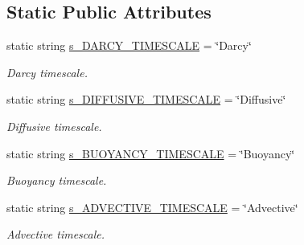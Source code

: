 \subsection*{Static Public Attributes}
\begin{DoxyCompactItemize}
\item 
\mbox{\label{class_mushy_layer_params_a8b58b8b36c7fe399d6b8e6c704459421}} 
static string \hyperlink{class_mushy_layer_params_a8b58b8b36c7fe399d6b8e6c704459421}{s\+\_\+\+D\+A\+R\+C\+Y\+\_\+\+T\+I\+M\+E\+S\+C\+A\+LE} = \char`\"{}Darcy\char`\"{}
\begin{DoxyCompactList}\small\item\em Darcy timescale. \end{DoxyCompactList}\item 
\mbox{\label{class_mushy_layer_params_ac67a4fe28ad2dd726bb0c27f0a8d0be2}} 
static string \hyperlink{class_mushy_layer_params_ac67a4fe28ad2dd726bb0c27f0a8d0be2}{s\+\_\+\+D\+I\+F\+F\+U\+S\+I\+V\+E\+\_\+\+T\+I\+M\+E\+S\+C\+A\+LE} = \char`\"{}Diffusive\char`\"{}
\begin{DoxyCompactList}\small\item\em Diffusive timescale. \end{DoxyCompactList}\item 
\mbox{\label{class_mushy_layer_params_a5ea3607034b7bf698b7e4f6fbd315004}} 
static string \hyperlink{class_mushy_layer_params_a5ea3607034b7bf698b7e4f6fbd315004}{s\+\_\+\+B\+U\+O\+Y\+A\+N\+C\+Y\+\_\+\+T\+I\+M\+E\+S\+C\+A\+LE} = \char`\"{}Buoyancy\char`\"{}
\begin{DoxyCompactList}\small\item\em Buoyancy timescale. \end{DoxyCompactList}\item 
\mbox{\label{class_mushy_layer_params_a87db5b32e8e0c45382166d656f6f5d44}} 
static string \hyperlink{class_mushy_layer_params_a87db5b32e8e0c45382166d656f6f5d44}{s\+\_\+\+A\+D\+V\+E\+C\+T\+I\+V\+E\+\_\+\+T\+I\+M\+E\+S\+C\+A\+LE} = \char`\"{}Advective\char`\"{}
\begin{DoxyCompactList}\small\item\em Advective timescale. \end{DoxyCompactList}\item 

\end{DoxyCompactItemize}
